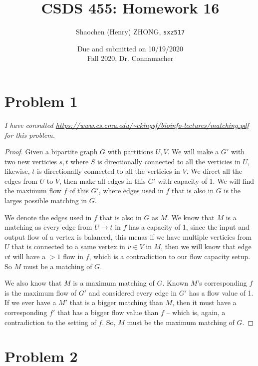 \documentclass[11pt]{article}
\newcommand{\ilc}{\texttt}
\begin{document}
\title{\textbf{CSDS 455: Homework 16}}

\author{Shaochen (Henry) ZHONG, \ilc{sxz517}}
\date{Due and submitted on 10/19/2020 \\ Fall 2020, Dr. Connamacher}
\maketitle



\section*{Problem 1}

\textit{I have consulted \url{https://www.cs.cmu.edu/~ckingsf/bioinfo-lectures/matching.pdf} for this problem.}

\begin{proof}

Given a bipartite graph $G$ with partitions $U, V$. We will make a $G'$ with two new verticies $s, t$ where $S$ is directionally connected to all the verticies in $U$, likewise, $t$ is directionally connected to all the verticies in $V$. We direct all the edges from $U$ to $V$, then make all edges in this $G'$ with capacity of 1. We will find the maximum flow $f$ of this $G'$, where edges used in $f$ that is also in $G$ is the larges possible matching in $G$.\newline

We denote the edges used in $f$ that is also in $G$ as $M$. We know that $M$ is a matching as every edge from $U \to t$ in $f$ has a capacity of 1, since the input and output flow of a vertex is balanced, this menas if we have multiple verticies from $U$ that is connected to a same vertex in $v \in V$ in $M$, then we will know that edge $vt$ will have a $> 1$ flow in $f$, which is a contradiction to our flow capacity setup. So $M$ must be a matching of $G$.

We also know that $M$ is a maximum matching of $G$. Known $M$'s corresponding $f$ is the maximum flow of $G'$ and considered every edge in $G'$ has a flow value of 1. If we ever have a $M'$ that is a bigger matching than $M$, then it must have a corresponding $f'$ that has a bigger flow value than $f$ -- which is, again, a contradiction to the setting of $f$. So, $M$ must be the maximum matching of $G$.

\end{proof}


\section*{Problem 2}
\end{document}
